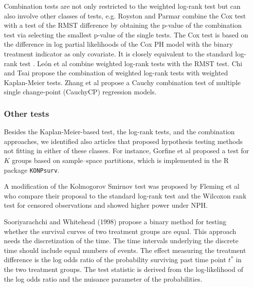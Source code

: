 \noindent Combination tests are not only restricted to the weighted log-rank test but can also involve other classes of tests, e.g. Royston and Parmar \cite{Royston.2016} combine the Cox test with a test of the RMST difference by obtaining the p-value of the combination test via selecting the smallest p-value of the single tests. The Cox test is based on the difference in log partial likelihoods of the Cox PH model with the binary treatment indicator as only covariate. It is closely equivalent to the standard log-rank test \cite{Royston.2016}. Le\'{o}n et al \cite{Leon.2020} combine weighted log-rank tests with the RMST test. Chi and Tsai  \cite{Chi.2001} propose the combination of weighted log-rank tests with weighted Kaplan-Meier tests. Zhang et al  \cite{Zhang.2021} propose a Cauchy combination test of multiple single change-point (CauchyCP) regression models.

\noindent 


\subsubsection{Other tests} \label{other_test}

\noindent 

\noindent Besides the Kaplan-Meier-based test, the log-rank tests, and the combination approaches, we identified also articles that proposed hypothesis testing methods not fitting in either of these classes. For instance, Gorfine et al \cite{Gorfine.2020} proposed a test for $K$ groups based on sample--space partitions, which is implemented in the R package \texttt{KONPsurv}.

\noindent A modification of the Kolmogorov Smirnov test was proposed by Fleming et al \cite{Fleming.1980} who compare their proposal to the standard log-rank test and the Wilcoxon rank test for censored observations \cite{Gehan.1965} and showed higher power under NPH. 

\noindent Sooriyarachchi and Whitehead (1998) propose a binary method for testing whether the survival curves of two treatment groups are equal. This approach needs the discretization of the time. The time intervals underlying the discrete time should include equal numbers of events. The effect measuring the treatment difference is the log odds ratio of the probability surviving past time point $t^*$ in the two treatment groups. The test statistic is derived from the log-likelihood of the log odds ratio and the nuisance parameter of the probabilities. 

